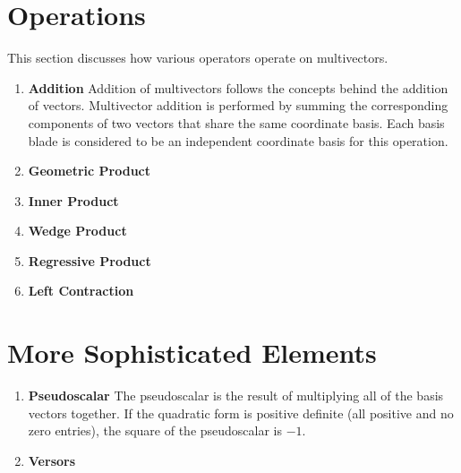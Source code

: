 \documentclass[8pt]{article}
\begin{document}
\section{Operations}

This section discusses how various operators operate on multivectors.

\begin{enumerate}
  \item \textbf{Addition}
        Addition of multivectors follows the concepts behind the addition of vectors. Multivector addition is performed by summing the corresponding components of two vectors that share the same coordinate basis. Each basis blade is considered to be an independent coordinate basis for this operation.

  \item \textbf{Geometric Product}

  \item \textbf{Inner Product}

  \item \textbf{Wedge Product}

  \item \textbf{Regressive Product}

  \item \textbf{Left Contraction}

\end{enumerate}

\section{More Sophisticated Elements}

\begin{enumerate}

  \item \textbf{Pseudoscalar}
        The pseudoscalar is the result of multiplying all of the basis vectors together. If the quadratic form is positive definite (all positive and no zero entries), the square of the pseudoscalar is $-1$.

  \item \textbf{Versors}

\end{enumerate}
\end{document}
